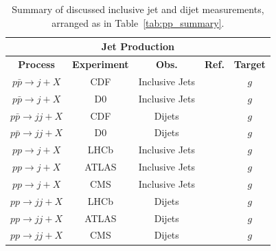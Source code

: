 \documentclass[12pt,twoside,openright]{report}
\begin{document}
\begin{spacing}{1.5}
\begin{table}
\begin{center}
\begin{tabular}{|c|c|c|c|c|}
\hline
\multicolumn{5}{|c|}{\textbf{Jet Production}}\\
\hline
\textbf{Process} & \textbf{Experiment} & \textbf{Obs.} &\textbf{Ref.} &  \textbf{Target} \\
\hline\hline
$p\bar{p} \to j + X $ & CDF & Inclusive Jets & \cite{Abulencia:2007ez,Aaltonen:2008eq} & $g$\\
$p\bar{p} \to j + X $ & D0 & Inclusive Jets & \cite{Abazov:2008ae} & $g$\\
\hline
$p\bar{p} \to jj + X $ & CDF & Dijets & \cite{Aaltonen:2008dn} & $g$\\
$p\bar{p} \to jj + X $ & D0 & Dijets & \cite{Abazov:2010fr} & $g$ \\
\hline
\hline
$pp \to j + X $ & LHCb & Inclusive Jets &\cite{LHCb:2011xqa} & $g$\\
$pp \to j + X $ & ATLAS & Inclusive Jets &\cite{Aad:2010ad,Aad:2011fc,Aad:2013lpa} & $g$ \\
$pp \to j + X $ & CMS & Inclusive Jets &\cite{CMS:2011ab,Chatrchyan:2012gwa,Chatrchyan:2012bja} & $g$ \\
\hline
$pp \to jj + X $ & LHCb & Dijets & \cite{LHCb:2011xqa} & $g$\\
$pp \to jj + X $ & ATLAS & Dijets &\cite{Aad:2010ad,Aad:2011fc} & $g$\\
$pp \to jj + X $ & CMS & Dijets & \cite{Chatrchyan:2012gwa,Chatrchyan:2012bja} & $g$\\
\hline
\end{tabular}
\end{center}
\label{tab:JET_summary}
\caption{Summary of discussed inclusive jet and dijet measurements, arranged as in Table~\ref{tab:pp_summary}.}
\end{table}%



\end{spacing}
\end{document}

